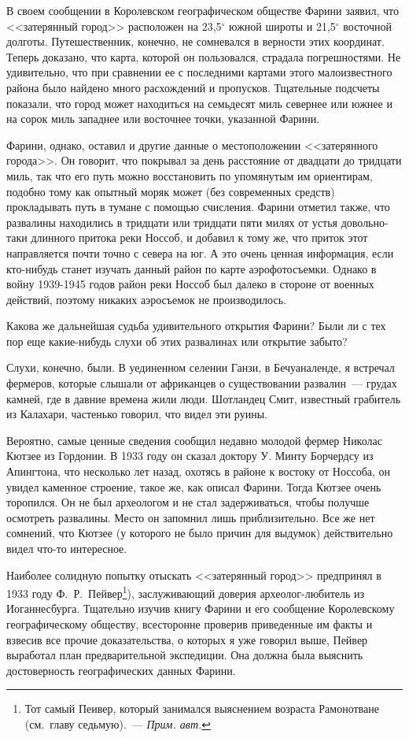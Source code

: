 \documentclass[12pt,a4paper,twoside,openany,svgnames]{memoir}
\begin{document}
В своем сообщении в Королевском географическом обществе Фарини заявил, что <<затерянный город>> расположен на 23,5$^{\circ}$ южной широты и 21,5$^{\circ}$ восточной долготы. Путешественник, конечно, не сомневался в верности этих координат. Теперь доказано, что карта, которой он пользовался, страдала погрешностями. Не удивительно, что при сравнении ее с последними картами этого малоизвестного района было найдено много расхождений и пропусков. Тщательные подсчеты показали, что город может находиться на семьдесят миль севернее или южнее и на сорок миль западнее или восточнее точки, указанной Фарини.

Фарини, однако, оставил и другие данные о местоположении <<затерянного города>>. Он говорит, что покрывал за день расстояние от двадцати до тридцати миль, так что его путь можно восстановить по упомянутым им ориентирам, подобно тому как опытный моряк может (без современных средств) прокладывать путь в тумане с помощью счисления. Фарини отметил также, что развалины находились в тридцати или тридцати пяти милях от устья довольно-таки длинного притока реки Носсоб, и добавил к тому же, что приток этот направляется почти точно с севера на юг. А это очень ценная информация, если кто-нибудь станет изучать данный район по карте аэрофотосъемки. Однако в войну 1939-1945 годов район реки Носсоб был далеко в стороне от военных действий, поэтому никаких аэросъемок не производилось.

Какова же дальнейшая судьба удивительного открытия Фарини? Были ли с тех пор еще какие-нибудь слухи об этих развалинах или открытие забыто?

Слухи, конечно, были. В уединенном селении Ганзи, в Бечуаналенде, я встречал фермеров, которые слышали от африканцев о существовании развалин~--- грудах камней, где в давние времена жили люди. Шотландец Смит, известный грабитель из Калахари, частенько говорил, что видел эти руины.

Вероятно, самые ценные сведения сообщил недавно молодой фермер Николас Кютзее из Гордонии. В 1933 году он сказал доктору У. Минту Борчердсу из Апингтона, что несколько лет назад, охотясь в районе к востоку от Носсоба, он увидел каменное строение, такое же, как описал Фарини. Тогда Кютзее очень торопился. Он не был археологом и не стал задерживаться, чтобы получше осмотреть развалины. Место он запомнил лишь приблизительно. Все же нет сомнений, что Кютзее (у которого не было причин для выдумок) действительно видел что-то интересное.

Наиболее солидную попытку отыскать <<затерянный город>> предпринял в 1933 году Ф.~Р.~Пейвер\footnote{Тот самый Пеивер, который занимался выяснением возраста Рамонотване 
(см.~главу седьмую).~--- \textit{Прим. авт.}}), заслуживающий доверия археолог-любитель из Иоганнесбурга. Тщательно изучив книгу Фарини и его сообщение Королевскому географическому обществу, всесторонне проверив приведенные им факты и взвесив все прочие доказательства, о которых я уже говорил выше, Пейвер выработал план предварительной экспедиции. Она должна была выяснить достоверность географических данных Фарини.
\end{document}
